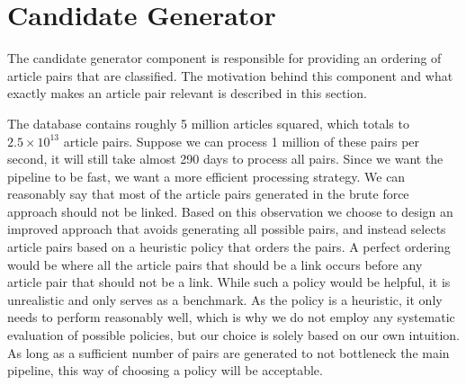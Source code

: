 \section{Candidate Generator}

The candidate generator component is responsible for providing an ordering of article pairs that are classified. The motivation behind this component and what exactly makes an article pair relevant is described in this section.

The database contains roughly 5 million articles squared, which totals to $2.5 \times 10^{13}$ article pairs. Suppose we can process 1 million of these pairs per second, it will still take almost 290 days to process all pairs. Since we want the pipeline to be fast, we want a more efficient processing strategy. We can reasonably say that most of the article pairs generated in the brute force approach should not be linked. Based on this observation we choose to design an improved approach that avoids generating all possible pairs, and instead selects article pairs based on a heuristic policy that orders the pairs. A perfect ordering would be where all the article pairs that should be a link occurs before any article pair that should not be a link. While such a policy would be helpful, it is unrealistic and only serves as a benchmark. As the policy is a heuristic, it only needs to perform reasonably well, which is why we do not employ any systematic evaluation of possible policies, but our choice is solely based on our own intuition. As long as a sufficient number of pairs are generated to not bottleneck the main pipeline, this way of choosing a policy will be acceptable.

